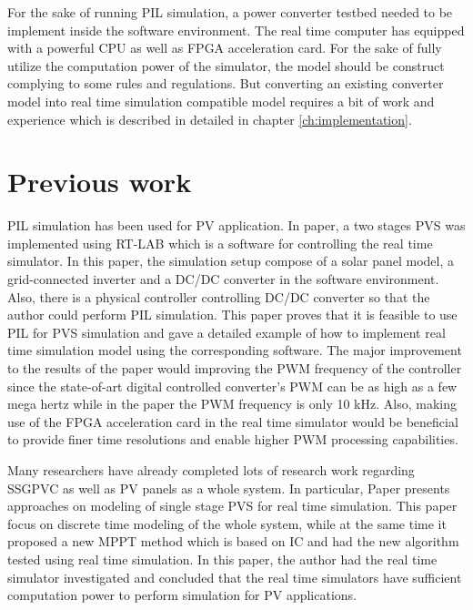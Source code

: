 For the sake of running \gls{PIL} simulation, a power converter testbed needed to be implement inside the software environment. The real time computer has equipped with a powerful \gls{CPU} as well as \gls{FPGA} acceleration card. For the sake of fully utilize the computation power of the simulator, the model should be construct complying to some rules and regulations. But converting an existing converter model into real time simulation compatible model requires a bit of work and experience which is described in detailed in chapter \ref{ch:implementation}.

\section{Previous work}
\gls{PIL} simulation has been used for \gls{PV} application. In paper,\cite{RN11} a two stages \gls{PVS} was implemented using RT-LAB which is a software for controlling the real time simulator. In this paper, the simulation setup compose of a solar panel model, a grid-connected inverter and a DC/DC converter in the software environment. Also, there is a physical controller controlling DC/DC converter so that the author could perform \gls{PIL} simulation. This paper proves that it is feasible to use \gls{PIL} for \gls{PVS} simulation and gave a detailed example of how to implement real time simulation model using the corresponding software. The major improvement to the results of the paper would improving the \gls{PWM} frequency of the controller since the state-of-art digital controlled converter's \gls{PWM} can be as high as a few mega hertz while in the paper the \gls{PWM} frequency is only 10 kHz. Also, making use of the \gls{FPGA} acceleration card in the real time simulator would be beneficial to provide finer time resolutions and enable higher \gls{PWM} processing capabilities.

Many researchers have already completed lots of research work regarding \gls{SSGPVC} as well as PV panels as a whole system. In particular, Paper \cite{RN3} presents approaches on modeling of single stage \gls{PVS} for real time simulation. This paper focus on discrete time modeling of the whole system, while at the same time it proposed a new MPPT method which is based on \gls{IC} and had the new algorithm tested using real time simulation. In this paper, the author had the real time simulator investigated and concluded that the real time simulators have sufficient computation power to perform simulation for PV applications. 